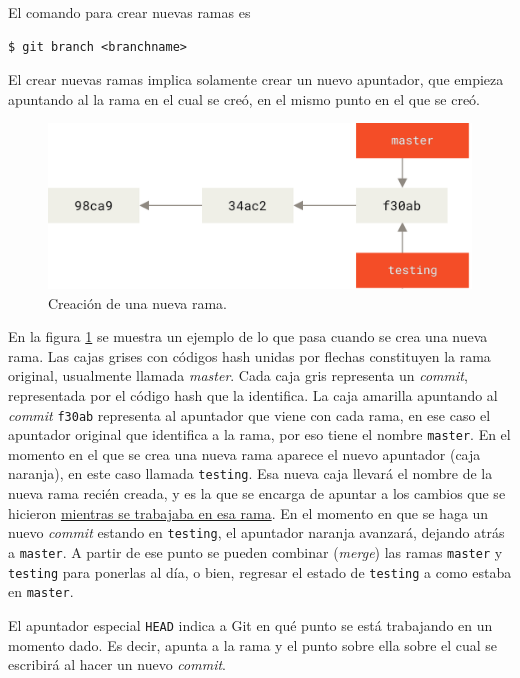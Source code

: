 \documentclass[spanish, 12pt, a4paper]{article}
\begin{document}
El comando para crear nuevas ramas es 
\begin{lstlisting}
$ git branch <branchname>
\end{lstlisting}

El crear nuevas ramas implica solamente crear un nuevo apuntador, que empieza apuntando al la rama en el cual se creó, en el mismo punto en el que se creó.

\begin{figure}[h]
  \centering
  \includegraphics[width=\textwidth]{figs/two-branches.png}
  \caption{Creación de una nueva rama.}
  \label{fig:two-branches}
\end{figure}

En la figura \ref{fig:two-branches} se muestra un ejemplo de lo que pasa cuando se crea una nueva rama.
Las cajas grises con códigos hash unidas por flechas constituyen la rama original, usualmente llamada \textit{master}.
Cada caja gris representa un \textit{commit}, representada por el código hash que la identifica.
La caja amarilla apuntando al \textit{commit} \texttt{f30ab} representa al apuntador que viene con cada rama, en ese caso el apuntador original que identifica a la rama, por eso tiene el nombre \texttt{master}.
En el momento en el que se crea una nueva rama aparece el nuevo apuntador (caja naranja), en este caso llamada \texttt{testing}.
Esa nueva caja llevará el nombre de la nueva rama recién creada, y es la que se encarga de apuntar a los cambios que se hicieron \underline{mientras se trabajaba en esa rama}.
En el momento en que se haga un nuevo \textit{commit} estando en \texttt{testing}, el apuntador naranja avanzará, dejando atrás a \texttt{master}.
A partir de ese punto se pueden combinar (\textit{merge}) las ramas \texttt{master} y \texttt{testing} para ponerlas al día, o bien, regresar el estado de \texttt{testing} a como estaba en \texttt{master}.

El apuntador especial \texttt{HEAD} indica a Git en qué punto se está trabajando en un momento dado.
Es decir, apunta a la rama y el punto sobre ella sobre el cual se escribirá al hacer un nuevo \textit{commit}.
\end{document}
